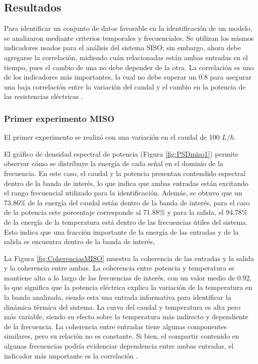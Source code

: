 \documentclass[11pt]{report}
\begin{document}
\subsection{Resultados}

Para identificar un conjunto de datos favorable en la identificación de un modelo, se analizaron mediante criterios temporales y frecuenciales. Se utilizan los mismos indicadores usados para el análisis del sistema SISO; sin embargo, ahora debe agregarse la correlación, midiendo cuán relacionadas están ambas entradas en el tiempo, pues el cambio de una no debe depender de la otra. La correlación es uno de los indicadores más importantes, la cual no debe superar un 0.8 para asegurar una baja correlación entre la variación del caudal y el cambio en la potencia de las resistencias eléctricas \cite{csurcsia2020user}. 

\subsubsection{Primer experimento MISO}
El primer experimento se realizó con una variación en el caudal de 100 $L/h$.

El gráfico de densidad espectral de potencia (Figura \ref{fig:PSDmiso1}) permite observar cómo se distribuye la energía de cada señal en el dominio de la frecuencia. En este caso, el caudal y la potencia presentan contendido espectral dentro de la banda de interés, lo que indica que ambas entradas están excitando el rango frecuencial utilizado para la identificación. Además, se obtuvo que un 73.86\% de la energía del caudal están dentro de la banda de interés, para el caso de la potencia este porcentaje corresponde al 71.88\% y para la salida, el 94.78\% de la energía de la temperatura está dentro de las frecuencias útiles del sistema. Esto indica que una fracción importante de la energía de las entradas y de la salida se encuentra dentro de la banda de interés, 

La Figura \ref{fig:CoherenciasMISO} muestra la coherencia de las entradas y la salida y la coherencia entre ambas.
La coherencia entre potencia y temperatura se mantiene alta a lo largo de las frecuencias de interés, con un valor medio de 0.92, lo que significa que la potencia eléctrica explica la variación de la temperatura en la banda analizada, siendo esta una entrada informativa para identificar la dinámica térmica del sistema. La curva del caudal y temperatura es alta pero más variable, siendo su efecto sobre la temperatura más indirecto y dependiente de la frecuencia. La coherencia entre entradas tiene algunas componentes similares, pero su relación no es constante. Si bien, el compartir contenido en algunas frecuencias podría evidenciar dependencia entre ambas entradas, el indicador más importante es la correlación \cite{csurcsia2020user}.
\end{document}
